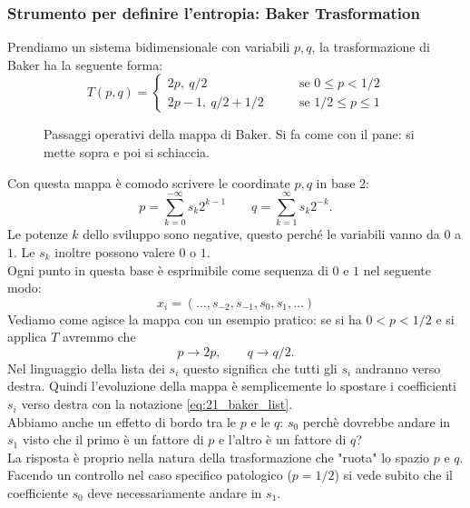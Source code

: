 \subsubsection{Strumento per definire l'entropia: Baker Trasformation}%
\label{subsub:Applicazione: Baker Trasformation}
Prendiamo un sistema bidimensionale con variabili $p,q$, la trasformazione di Baker ha la seguente forma:
\[
    T(p,q)=
    \begin{cases}
	2p ,\  q /2 \qquad &\text{se } 0 \le p < 1 /2\\
	2p-1, \ q /2 + 1 /2 \qquad &\text{se } 1 /2 \le p \le 1
    \end{cases}
\]
\begin{figure}[H]
    \centering
    \caption{\scriptsize Passaggi operativi della mappa di Baker. Si fa come con il pane: si mette sopra e poi si schiaccia.}
    \label{fig:21_baker}
\end{figure}
\noindent
Con questa mappa è comodo scrivere le coordinate $p,q$ in base 2:
\[
    p = \sum_{k=0}^{-\infty} s_k 2^{k-1} \qquad q = \sum_{k=1}^{\infty} s_k 2^{-k}
.\] 
Le potenze $k$ dello sviluppo sono negative, questo perché le variabili vanno da $0$ a $1$. Le $s_k$ inoltre possono valere $0$ o $1$.\\
Ogni punto in questa base è esprimibile come sequenza di $0$ e $1$ nel seguente modo:
\begin{equation}
    x_i = \left(\ldots, s_{-2}, s_{-1}, s_0, s_1, \ldots\right)
    \label{eq:21_baker_list}
\end{equation}
Vediamo come agisce la mappa con un esempio pratico: se si ha $0<p< 1 /2$ e si applica $T$ avremmo che 
\[
    p\to 2p, \qquad q \to q /2
.\] 
Nel linguaggio della lista dei $s_i$ questo significa che tutti gli $s_i$ andranno verso destra. Quindi l'evoluzione della mappa è semplicemente lo spostare i coefficienti $s_i$ verso destra con la notazione \ref{eq:21_baker_list}.\\
Abbiamo anche un effetto di bordo tra le $p$ e le $q$: $s_0$ perchè dovrebbe andare in $s_1$ visto che il primo è un fattore di $p$ e l'altro è un fattore di $q$?\\
La risposta è proprio nella natura della trasformazione che "ruota" lo spazio $p$ e $q$. Facendo un controllo nel caso specifico patologico ($p=1/2$) si vede subito che il coefficiente $s_0$ deve necessariamente andare in $s_1$.\\

